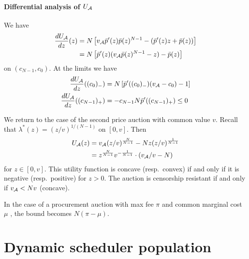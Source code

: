 \paragraph{Differential analysis of $U_{\mathcal{A}}$}
We have
\begin{align*}
  \frac{dU_{\mathcal{A}}}{dz}(z) &= N\left[ v_{\mathcal{A}}\bar{p}'(z)\bar{p}(z)^{N-1} - (\bar{p}'(z)z + \bar{p}(z) ) \right] \\
  &= N\left[ \bar{p}'(z)(v_{\mathcal{A}}\bar{p}(z)^{N-1} - z) - \bar{p}(z) \right]
\end{align*}
on $(c_{N-1},c_0)$.
%
At the limits we have
\begin{align*}
    \frac{dU_{\mathcal{A}}}{dz}((c_0)_-) &= N\left[ \bar{p}'((c_0)_-)(v_{\mathcal{A}}-c_0) - 1 \right] \\
    \frac{dU_{\mathcal{A}}}{dz}((c_{N-1})_+) &= -c_{N-1}N\bar{p}'((c_{N-1})_+) \leq 0
\end{align*}

\begin{example}

  We return to the case of the second price auction with common value $v$.
  Recall that $\lambda^*(z)=(z/v)^{1/(N-1)}$ on $[0,v]$.
  Then 
  \begin{align*}
    U_{\mathcal{A}}(z) &= v_{\mathcal{A}} (z/v)^{\frac{N}{N-1}} - Nz(z/v)^{\frac{1}{N-1}} \\
    &= z^{\frac{N}{N-1}}v^{-\frac{1}{N-1}}\cdot \left(v_{\mathcal{A}}/v - N  \right)
  \end{align*}
  for $z\in[0,v]$.
  This utility function is concave (resp.~convex) if and only if it is negative (resp.~positive) for $z>0$.
  The auction is censorship resistant if and only if $v_{\mathcal{A}} < Nv$ (concave).

  In the case of a procurement auction with max fee $\pi$ and common marginal cost $\mu$ \cite[\S3.2]{roughgarden2024transaction}, the bound becomes $N(\pi-\mu)$.

\end{example}


\newpage
\section{Dynamic scheduler population}

